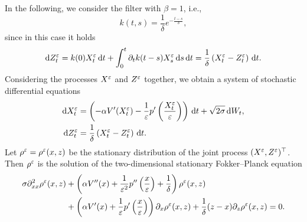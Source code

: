 \documentclass[10pt]{article}
\begin{document}
In the following, we consider the filter with $\beta = 1$, i.e.,
\begin{equation}
	k(t,s) = \frac{1}{\delta} e^{-\frac{t-s}{\delta}},
\end{equation}
since in this case it holds
\begin{equation}
	\mathrm{d} Z^\varepsilon_t = k(0) X^\varepsilon_t \,\mathrm{d} t + \int_0^t \partial_t k(t-s) X^\varepsilon_s \,\mathrm{d} s \,\mathrm{d} t = \frac{1}{\delta} \left ( X^\varepsilon_t - Z^\varepsilon_t \right ) \,\mathrm{d} t.
\end{equation}
Considering the processes $X^\varepsilon$ and $Z^\varepsilon$ together, we obtain a system of stochastic differential equations
\begin{equation}
\label{systemSDE}
\begin{aligned}
\mathrm{d} X^\varepsilon_t &= \left ( - \alpha V'(X^\varepsilon_t) - \frac{1}{\varepsilon} p' \left ( \frac{X^\varepsilon_t}{\varepsilon} \right ) \right ) \,\mathrm{d} t + \sqrt{2\sigma} \,\mathrm{d} W_t, \\
\mathrm{d} Z^\varepsilon_t &= \frac{1}{\delta} \left ( X^\varepsilon_t - Z^\varepsilon_t \right ) \,\mathrm{d} t.
\end{aligned}
\end{equation}
Let $\rho^\varepsilon = \rho^\varepsilon(x,z)$ be the stationary distribution of the joint process $(X^\varepsilon, Z^\varepsilon)^\top$. Then $\rho^\varepsilon$ is the solution of the two-dimensional stationary Fokker--Planck equation
\begin{equation}
\begin{aligned}
	\label{eq:FPsystem}
	\sigma \partial^2_{xx} \rho^\varepsilon(x,z) & + \left ( \alpha V''(x) + \frac{1}{\varepsilon^2} p'' \left ( \frac{x}{\varepsilon} \right ) + \frac{1}{\delta} \right ) \rho^\varepsilon(x,z) \\
	& + \left ( \alpha V'(x) + \frac{1}{\varepsilon} p' \left ( \frac{x}{\varepsilon} \right ) \right ) \partial_x \rho^\varepsilon(x,z) + \frac{1}{\delta}(z - x) \partial_z \rho^\varepsilon(x,z) = 0.
\end{aligned}
\end{equation}
\end{document}
